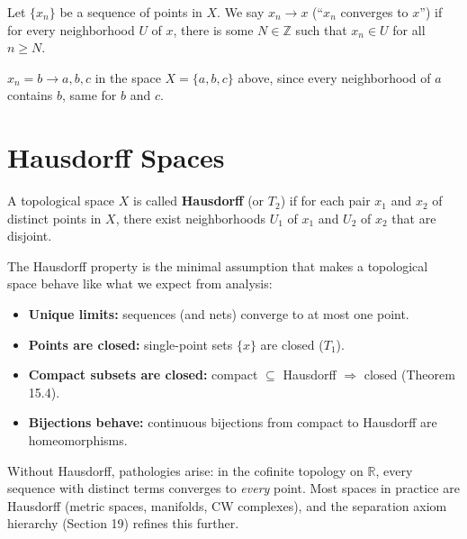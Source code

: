 \documentclass[11pt]{report}
\begin{document}
\begin{defbox}[Convergence]
Let $\{x_n\}$ be a sequence of points in $X$. We say $x_n \to x$ (``$x_n$ converges to $x$'') if for every neighborhood $U$ of $x$, there is some $N \in \mathbb{Z}$ such that $x_n \in U$ for all $n \geq N$.
\end{defbox}

\begin{exbox}
$x_n = b \to a, b, c$ in the space $X = \{a,b,c\}$ above, since every neighborhood of $a$ contains $b$, same for $b$ and $c$.
\end{exbox}

\section{Hausdorff Spaces}

\begin{defbox}
A topological space $X$ is called \textbf{Hausdorff} (or $T_2$) if for each pair $x_1$ and $x_2$ of distinct points in $X$, there exist neighborhoods $U_1$ of $x_1$ and $U_2$ of $x_2$ that are disjoint.
\end{defbox}

\begin{rembox}
The Hausdorff property is the minimal assumption that makes a topological space behave like what we expect from analysis:
\begin{itemize}
    \item \textbf{Unique limits:} sequences (and nets) converge to at most one point.
    \item \textbf{Points are closed:} single-point sets $\{x\}$ are closed ($T_1$).
    \item \textbf{Compact subsets are closed:} compact $\subseteq$ Hausdorff $\Rightarrow$ closed (Theorem 15.4).
    \item \textbf{Bijections behave:} continuous bijections from compact to Hausdorff are homeomorphisms.
\end{itemize}
Without Hausdorff, pathologies arise: in the cofinite topology on $\mathbb{R}$, every sequence with distinct terms converges to \emph{every} point. Most spaces in practice are Hausdorff (metric spaces, manifolds, CW complexes), and the separation axiom hierarchy (Section 19) refines this further.
\end{rembox}
\end{document}
